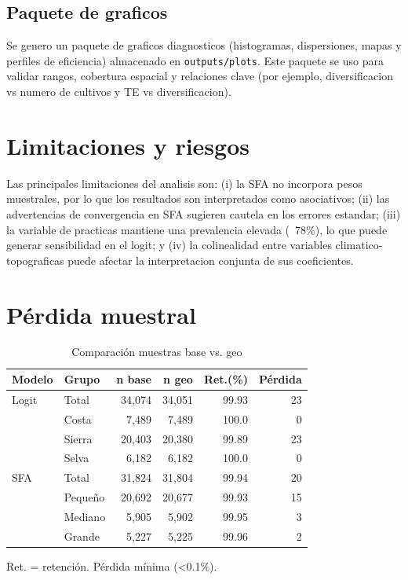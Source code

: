 \documentclass[10pt,a4paper]{article}
\begin{document}
\subsection{Paquete de graficos}
Se genero un paquete de graficos diagnosticos (histogramas, dispersiones, mapas y perfiles de eficiencia) almacenado en \texttt{outputs/plots}. Este paquete se uso para validar rangos, cobertura espacial y relaciones clave (por ejemplo, diversificacion vs numero de cultivos y TE vs diversificacion).

\section{Limitaciones y riesgos}
Las principales limitaciones del analisis son: (i) la SFA no incorpora pesos muestrales, por lo que los resultados son interpretados como asociativos; (ii) las advertencias de convergencia en SFA sugieren cautela en los errores estandar; (iii) la variable de practicas mantiene una prevalencia elevada (~78\%), lo que puede generar sensibilidad en el logit; y (iv) la colinealidad entre variables climatico-topograficas puede afectar la interpretacion conjunta de sus coeficientes.

\section{Pérdida muestral}

\begin{table}[H]
\centering
\caption{Comparación muestras base vs. geo}
\label{tab:sample_loss}
\begin{threeparttable}
\small
\begin{tabular}{llrrrr}
\toprule
\textbf{Modelo} & \textbf{Grupo} & \textbf{n base} & \textbf{n geo} & \textbf{Ret.(\%)} & \textbf{Pérdida} \\
\midrule
Logit & Total & 34,074 & 34,051 & 99.93 & 23 \\
& Costa & 7,489 & 7,489 & 100.0 & 0 \\
& Sierra & 20,403 & 20,380 & 99.89 & 23 \\
& Selva & 6,182 & 6,182 & 100.0 & 0 \\
\midrule
SFA & Total & 31,824 & 31,804 & 99.94 & 20 \\
& Pequeño & 20,692 & 20,677 & 99.93 & 15 \\
& Mediano & 5,905 & 5,902 & 99.95 & 3 \\
& Grande & 5,227 & 5,225 & 99.96 & 2 \\
\bottomrule
\end{tabular}
\begin{tablenotes}
\footnotesize
\item Ret. = retención. Pérdida mínima (<0.1\%).
\end{tablenotes}
\end{threeparttable}
\end{table}
\end{document}
